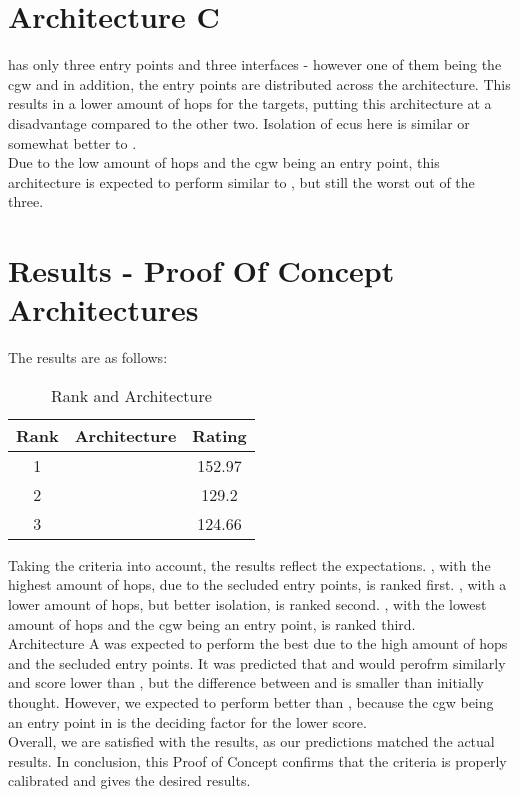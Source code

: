 \section{Architecture C}
\label{sec:archc}

 has only three entry points and three interfaces - however one of them being the \acrshort{cgw} and 
in addition, the entry points are distributed across the architecture. 
This results in a lower amount of hops for the targets, putting this architecture at a disadvantage compared to the other two.
Isolation of \acrshort{ecu}s here is similar or somewhat better to .\\
Due to the low amount of hops and the \acrshort{cgw} being an entry point, this architecture is expected to perform 
similar to , but still the worst out of the three.


\section{Results - Proof Of Concept Architectures}
\label{sec:resultsproof}

The results are as follows:

\begin{table}[h]
    \label{table:survey}
    \centering
    \caption{Rank and Architecture}
    \begin{tabular}{ |c|c|c| } 
    \hline
    Rank & Architecture & Rating\\
    \hline
    1 & \nameref{fig:architectureA} & 152.97\\ 
    2 & \nameref{fig:architectureB} & 129.2\\
    3 & \nameref{fig:architectureC} & 124.66\\
    \hline
    \end{tabular}
\end{table}

Taking the criteria into account, the results reflect the expectations.
, with the highest amount of hops, due to the secluded entry points, is ranked first.
, with a lower amount of hops, but better isolation, is ranked second.
, with the lowest amount of hops and the \acrshort{cgw} being an entry point, is ranked third.\\

Architecture A was expected to perform the best due to the high amount of hops and the secluded entry points.
It was predicted that  and  would perofrm similarly and score lower than ,
but the difference between  and  is smaller than initially thought. 
However, we expected  to perform better than , 
because the \acrshort{cgw} being an entry point in  is the deciding factor for the lower score.\\

Overall, we are satisfied with the results, as our predictions matched the actual results.
In conclusion, this Proof of Concept confirms that the criteria is properly calibrated and gives the desired results.